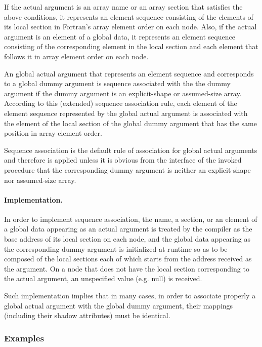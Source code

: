 If the actual argument is an array name or an array section that
satisfies the above conditions, it represents an element sequence
consisting of the elements of its local section in Fortran's array
element order on each node.
%
Also, if the actual argument is an element of a global data, it
represents an element sequence consisting of the corresponding element
in the local section and each element that follows it in array element
order on each node.

An global actual argument that represents an element sequence and
corresponds to a global dummy argument is sequence associated with
the the dummy argument if the dummy argument is an explicit-shape or
assumed-size array.
%
According to this (extended) sequence association rule, each element of
the element sequence represented by the global actual argument is
associated with the element of the local section of the global dummy
argument that has the same position in array element order.

Sequence association is the default rule of association for global
actual arguments and therefore is applied unless it is obvious from the
interface of the invoked procedure that the corresponding dummy argument
is neither an explicit-shape nor assumed-size array.


\paragraph{Implementation.}

In order to implement sequence association, the name, a section, or an
element of a global data appearing as an actual argument is treated by
the {\XMP} compiler as the base address of its local section on each
node, and the global data appearing as the corresponding dummy argument
is initialized at runtime so as to be composed of the local sections
each of which starts from the address received as the argument.
%
On a node that does not have the local section corresponding to the
actual argument, an unspecified value (e.g. null) is received.

Such implementation implies that in many cases, in order to associate
properly a global actual argument with the global dummy argument, their
mappings (including their shadow attributes) must be identical.


\subsubsection*{Examples}

